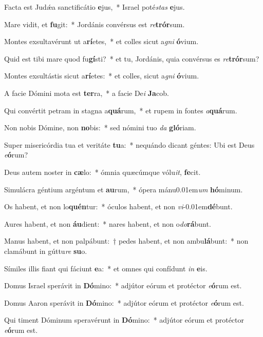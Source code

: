 \item Facta est Judǽa sanctificátio \textbf{e}jus,~* Israel poté\hspace{0.03em}\textit{stas} \textbf{e}jus.
\item Mare vidit, et \textbf{fu}git:~* Jordánis convérsus est \textit{re}\textbf{trór}sum.
\item Montes exsultavérunt ut a\textbf{rí}etes,~* et colles sicut a\textit{gni} \textbf{ó}vium.
\item Quid est tibi mare quod fu\textbf{gí}sti?~* et tu, Jordánis, quia convérsus es \textit{re}\textbf{trór}sum?
\item Montes exsultástis sicut a\textbf{rí}etes:~* et colles, sicut a\textit{gni} \textbf{ó}vium.
\item A facie Dómini mota est \textbf{ter}ra,~* a facie De\hspace{0.03em}\textit{i} \textbf{Ja}cob.
\item Qui convértit petram in stagna a\textbf{quá}rum,~* et rupem in fontes \textit{a}\textbf{quá}rum.
\item Non nobis Dómine, non \textbf{no}bis:~* sed nómini tuo \textit{da} \textbf{gló}riam.
\item Super misericórdia tua et veritáte \textbf{tu}a:~* nequándo dicant géntes: Ubi est Deus \textit{e}\textbf{ó}rum?
\item Deus autem noster in \textbf{cæ}lo:~* ómnia quæcúmque vólu\textit{it}, \textbf{fe}cit.
\item Simulácra géntium argéntum et \textbf{au}rum,~* ópera mánu\kern 0.01em\textit{um} \textbf{hó}minum.
\item Os habent, et non lo\textbf{quén}tur:~* óculos habent, et non \textit{vi}\kern -0.01em\textbf{dé}bunt.
\item Aures habent, et non \textbf{áu}dient:~* nares habent, et non o\textit{do}\textbf{rá}bunt.
\item Manus habent, et non palpábunt:~† pedes habent, et non ambu\textbf{lá}bunt:~* non clamábunt in gúttu\textit{re} \textbf{su}o.
\item Símiles illis fiant qui fáciunt \textbf{e}a:~* et omnes qui confídunt \textit{in} \textbf{e}is.
\item Domus Israel sperávit in \textbf{Dó}mino:~* adjútor eórum et protéctor \textit{e}\textbf{ó}rum est.
\item Domus Aaron sperávit in \textbf{Dó}mino:~* adjútor eórum et protéctor \textit{e}\textbf{ó}rum est.
\item Qui timent Dóminum speravérunt in \textbf{Dó}mino:~* adjútor eórum et protéctor \textit{e}\textbf{ó}rum est.
